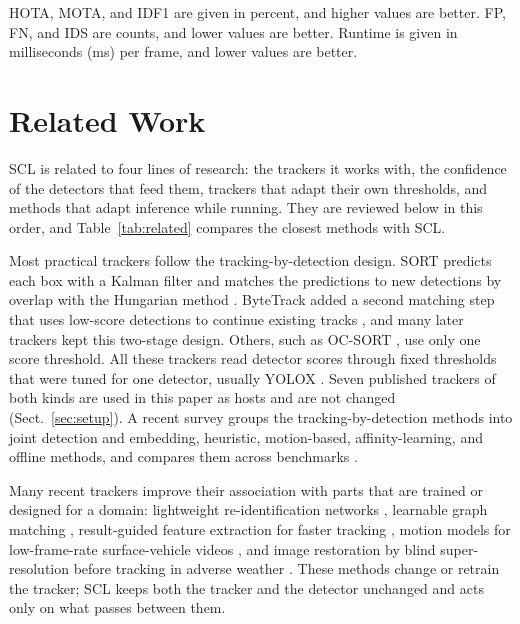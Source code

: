 \documentclass[pdflatex,referee,sn-mathphys-num]{sn-jnl}
\newcommand{\scl}{SCL}
\begin{document}
HOTA, MOTA, and IDF1 are given in percent, and higher values are better. FP,
FN, and IDS are counts, and lower values are better. Runtime is given in
milliseconds (ms) per frame, and lower values are better.
\section{Related Work}\label{sec:related}

\scl{} is related to four lines of research: the trackers it works with, the
confidence of the detectors that feed them, trackers that adapt their own
thresholds, and methods that adapt inference while running. They are
reviewed below in this order, and Table~\ref{tab:related} compares the
closest methods with \scl{}.

Most practical trackers follow the tracking-by-detection design. SORT
predicts each box with a Kalman filter and matches the predictions to new
detections by overlap with the Hungarian method \cite{bewley2016sort}.
ByteTrack added a second matching step that uses low-score detections to
continue existing tracks \cite{zhang2022bytetrack}, and many later trackers
kept this two-stage design. Others, such as OC-SORT \cite{cao2023ocsort}, use
only one score threshold. All these trackers read detector scores through
fixed thresholds that were tuned for one detector, usually YOLOX
\cite{ge2021yolox}. Seven published trackers of both kinds are used in this
paper as hosts and are not changed (Sect.~\ref{sec:setup}). A recent survey
groups the tracking-by-detection methods into joint detection and embedding,
heuristic, motion-based, affinity-learning, and offline methods, and compares
them across benchmarks \cite{adzemovic2026survey}.

Many recent trackers improve their association with parts that are trained or
designed for a domain: lightweight re-identification networks
\cite{li2024fdbtrack}, learnable graph matching
\cite{bao2024graphmatching,zhang2025sinkhorn}, result-guided feature
extraction for faster tracking \cite{ding2025remot}, motion models for
low-frame-rate surface-vehicle videos \cite{liang2024motiontrack}, and image
restoration by blind super-resolution before tracking in adverse weather
\cite{sun2026bsr}. These methods change or retrain the tracker; \scl{} keeps
both the tracker and the detector unchanged and acts only on what passes
between them.
\end{document}
